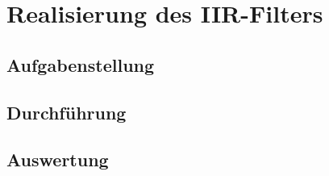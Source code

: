 \chapter{Realisierung des IIR-Filters}\label{Cha:RealIIR}
\section{Aufgabenstellung}

\section{Durchf\"uhrung}

\section{Auswertung}
